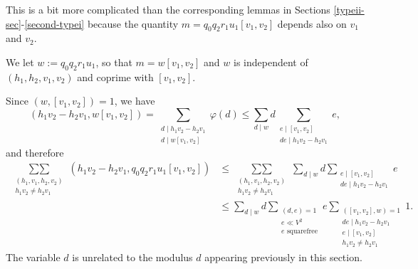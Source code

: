 \documentclass[12pt,a4paper,reqno]{amsart}
\numberwithin{equation}{section}
\theoremstyle{plain}
\theoremstyle{definition}
\newcommand\sumsum{\mathop{\sum\sum}\limits}
\begin{document}
This is a bit more complicated than the corresponding lemmas in
Sections \ref{typeii-sec}-\ref{second-typei} because the quantity
$m=q_0q_2r_1u_1[v_1,v_2]$ depends also on $v_1$ and $v_2$.

We let $w := q_0q_2r_1 u_1$, so that $m = w[v_1,v_2]$ and $w$ is
independent of $(h_1,h_2,v_1,v_2)$ and coprime with $[v_1,v_2]$.

Since $(w,[v_1,v_2])=1$, we have
$$
(h_1v_2-h_2v_1,w[v_1,v_2]) =\sum_{\substack{d\mid h_1v_2-h_2v_1\\d\mid
    w[v_1,v_2]}}\varphi(d)\leq \sum_{d\mid w}d \sum_{\substack{e\mid
    [v_1,v_2]\\ de\mid h_1v_2-h_2v_1}}e,
$$
and therefore
\begin{align*}
  \sumsum_{\substack{(h_1,v_1,h_2,v_2)\\
      h_1v_2\neq h_2v_1}}
  \left(h_1v_2-h_2v_1,q_0q_2r_1u_1[v_1,v_2]\right) &\leq
  \sumsum_{\substack{(h_1,v_1,h_2,v_2)\\
      h_1v_2\neq h_2v_1}} \sum_{d\mid w}d \sum_{\substack{e\mid
      [v_1,v_2]\\ de\mid h_1v_2-h_2v_1}}e\\
  &\leq \sum_{d\mid w}d \sum_{\substack{(d,e)=1\\e\ll V^2\\e\text{ squarefree}}}e
  \sum_{\substack{([v_1,v_2],w)=1\\de\mid h_1v_2-h_2v_1\\e\mid [v_1,v_2]\\
      h_1v_2\neq h_2v_1}}1.
\end{align*}
The variable $d$ is unrelated to the modulus $d$ appearing previously in this section.
\end{document}
